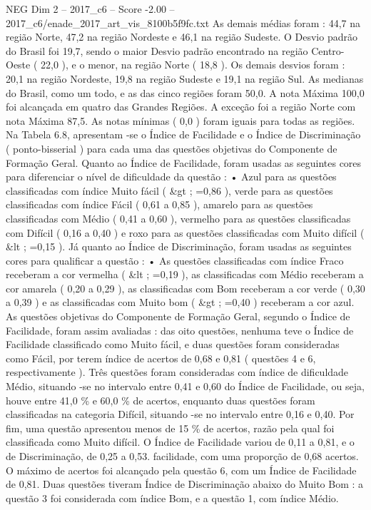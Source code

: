 \begin{textsample}{NEG Dim 2 – 2017\_c6 – Score -2.00 – 2017\_c6/enade\_2017\_art\_vis\_8100b5f9fc.txt}
As demais médias foram : 44,7 na região Norte, 47,2 na região Nordeste e 46,1 na região Sudeste.
O Desvio padrão do Brasil foi 19,7, sendo o maior Desvio padrão encontrado na região Centro-Oeste ( 22,0 ), e o menor, na região Norte ( 18,8 ).
Os demais desvios foram : 20,1 na região Nordeste, 19,8 na região Sudeste e 19,1 na região Sul.
As medianas do Brasil, como um todo, e as das cinco regiões foram 50,0.
A nota Máxima 100,0 foi alcançada em quatro das Grandes Regiões.
A exceção foi a região Norte com nota Máxima 87,5.
As notas mínimas ( 0,0 ) foram iguais para todas as regiões.
Na Tabela 6.8, apresentam -se o Índice de Facilidade e o Índice de Discriminação ( ponto-bisserial ) para cada uma das questões objetivas do Componente de Formação Geral.
Quanto ao Índice de Facilidade, foram usadas as seguintes cores para diferenciar o nível de dificuldade da questão : • Azul para as questões classificadas com índice Muito fácil ( \&gt ; =0,86 ), verde para as questões classificadas com índice Fácil ( 0,61 a 0,85 ), amarelo para as questões classificadas com Médio ( 0,41 a 0,60 ), vermelho para as questões classificadas com Difícil ( 0,16 a 0,40 ) e roxo para as questões classificadas com Muito difícil ( \&lt ; =0,15 ).
Já quanto ao Índice de Discriminação, foram usadas as seguintes cores para qualificar a questão : • As questões classificadas com índice Fraco receberam a cor vermelha ( \&lt ; =0,19 ), as classificadas com Médio receberam a cor amarela ( 0,20 a 0,29 ), as classificadas com Bom receberam a cor verde ( 0,30 a 0,39 ) e as classificadas com Muito bom ( \&gt ; =0,40 ) receberam a cor azul.
As questões objetivas do Componente de Formação Geral, segundo o Índice de Facilidade, foram assim avaliadas : das oito questões, nenhuma teve o Índice de Facilidade classificado como Muito fácil, e duas questões foram consideradas como Fácil, por terem índice de acertos de 0,68 e 0,81 ( questões 4 e 6, respectivamente ).
Três questões foram consideradas com índice de dificuldade Médio, situando -se no intervalo entre 0,41 e 0,60 do Índice de Facilidade, ou seja, houve entre 41,0 \% e 60,0 \% de acertos, enquanto duas questões foram classificadas na categoria Difícil, situando -se no intervalo entre 0,16 e 0,40.
Por fim, uma questão apresentou menos de 15 \% de acertos, razão pela qual foi classificada como Muito difícil.
O Índice de Facilidade variou de 0,11 a 0,81, e o de Discriminação, de 0,25 a 0,53. facilidade, com uma proporção de 0,68 acertos.
O máximo de acertos foi alcançado pela questão 6, com um Índice de Facilidade de 0,81.
Duas questões tiveram Índice de Discriminação abaixo do Muito Bom : a questão 3 foi considerada com índice Bom, e a questão 1, com índice Médio.

\end{textsample}
